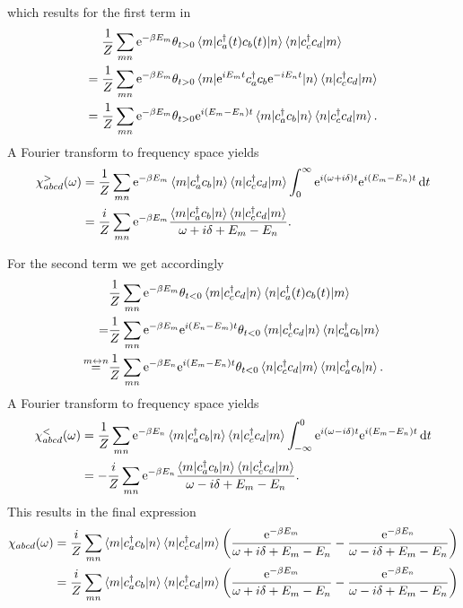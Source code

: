 \documentclass[12pt,a4paper]{scrartcl}
\numberwithin{equation}{section}
\renewcommand{\exp}[1]{\mathrm{e}^{#1}}
\begin{document}
which results for the first term in
\begin{align}
 \frac{1}{Z}\sum_{mn} \exp{-\beta E_m} 
 &\theta_{t>0}\braket{m|c^{\dagger}_a(t) c_b(t)|n}\braket{n| c^{\dagger}_c c_d |m} \\
%
 =\frac{1}{Z}\sum_{mn} \exp{-\beta E_m}
 &\theta_{t>0}\braket{m|\mathrm{e}^{iE_m t} c^{\dagger}_a  c_b \mathrm{e}^{-iE_nt } |n}\braket{n| c^{\dagger}_c c_d |m} \\
% 
 =\frac{1}{Z}\sum_{mn} \exp{-\beta E_m}
 &\theta_{t>0} \mathrm{e}^{i(E_m-E_n)t} \braket{m| c^{\dagger}_a c_b |n}\braket{n| c^{\dagger}_c c_d |m} .
%
\end{align}
A Fourier transform to frequency space yields
\begin{align}
 \chi^>_{abcd}(\omega) 
 &= \frac{1}{Z}\sum_{mn} \exp{-\beta E_m} \braket{m| c^{\dagger}_a c_b |n}\braket{n| c^{\dagger}_c c_d |m} \int_{0}^{\infty} \exp{i(\omega+i\delta)t} \mathrm{e}^{i(E_m-E_n)t}   \, \mathrm{d}t \\
 &= \frac{i}{Z} \sum_{mn} \exp{-\beta E_m} \frac{ \braket{m| c^{\dagger}_a c_b |n}\braket{n| c^{\dagger}_c c_d |m} }{ \omega+i\delta + E_m-E_n } .
\end{align}


For the second term we get accordingly
\begin{align}
 &\frac{1}{Z}\sum_{mn} \exp{-\beta E_m}
 \theta_{t<0}\braket{m|c^{\dagger}_c  c_d |n}\braket{n|c^{\dagger}_a(t) c_b(t) |m}  \\
%
 =&\frac{1}{Z}\sum_{mn} \exp{-\beta E_m}\mathrm{e}^{i(E_n-E_m)t}
 \theta_{t<0}\braket{m|c^{\dagger}_c c_d |n}\braket{n| c^{\dagger}_a c_b |m} \\
%
 \stackrel{m\leftrightarrow n}{=} &\frac{1}{Z}\sum_{mn} \exp{-\beta E_n}\mathrm{e}^{i(E_m-E_n)t}
 \theta_{t<0}\braket{n|c^{\dagger}_c c_d |m}\braket{m| c^{\dagger}_a c_b |n}. 
%
\end{align}
A Fourier transform to frequency space yields
\begin{align}
 \chi^<_{abcd}(\omega) 
 &= \frac{1}{Z}\sum_{mn} \exp{-\beta E_n} \braket{m| c^{\dagger}_a c_b |n}\braket{n|c^{\dagger}_c c_d |m} \int_{-\infty}^{0} \exp{i(\omega-i\delta)t} \mathrm{e}^{i(E_m-E_n)t}   \, \mathrm{d}t \\
 &= -\frac{i}{Z} \sum_{mn} \exp{-\beta E_n} \frac{ \braket{m| c^{\dagger}_a c_b |n}\braket{n|c^{\dagger}_c c_d |m} }{ \omega-i\delta + E_m-E_n } .
\end{align}
This results in the final expression
\begin{align}
 \chi_{abcd}(\omega) 
 &= \frac{i}{Z} \sum_{mn} \braket{m| c^{\dagger}_a c_b |n}\braket{n|c^{\dagger}_c c_d |m}
    \left( 
    \frac{\exp{-\beta E_m} }{\omega+i\delta + E_m-E_n} - \frac{\exp{-\beta E_n} }{\omega-i\delta + E_m-E_n}
    \right) \\
%
&= \frac{i}{Z} \sum_{mn} \braket{m| c^{\dagger}_a c_b |n}\braket{n|c^{\dagger}_c c_d |m}
    \left( 
    \frac{\exp{-\beta E_m} }{\omega+i\delta + E_m-E_n} - \frac{\exp{-\beta E_n} }{\omega-i\delta + E_m-E_n}
    \right)
\end{align}
\end{document}
